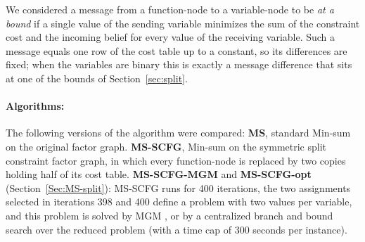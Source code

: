 We considered a message from a function-node to a variable-node to be \emph{at a bound} if a single value of the sending variable minimizes the sum of the constraint cost and the incoming belief for every value of the receiving variable. Such a message equals one row of the cost table up to a constant, so its differences are fixed; when the variables are binary this is exactly a message difference that sits at one of the bounds of Section~\ref{sec:split}.

\paragraph{Algorithms:}
The following versions of the algorithm were compared:
\textbf{MS}, standard Min-sum on the original factor graph. \textbf{MS-SCFG}, Min-sum on the symmetric split constraint factor graph, in which every function-node is replaced by two copies holding half of its cost table. \textbf{MS-SCFG-MGM} and \textbf{MS-SCFG-opt} (Section~\ref{Sec:MS-split}): MS-SCFG runs for 400 iterations, the two assignments selected in iterations 398 and 400 define a problem with two values per variable, and this problem is solved by MGM \cite{MaheswaranTBPV04}, or by a centralized branch and bound search over the reduced problem (with a time cap of 300 seconds per instance).
